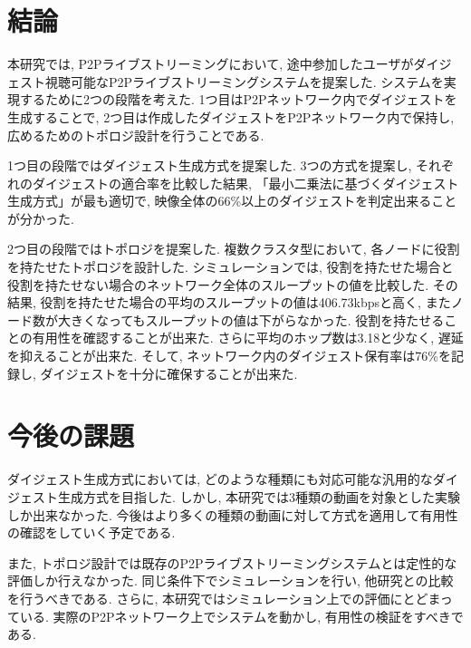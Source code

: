 \section{結論}
本研究では, P2Pライブストリーミングにおいて, 途中参加したユーザがダイジェスト視聴可能なP2Pライブストリーミングシステムを提案した. システムを実現するために2つの段階を考えた. 1つ目はP2Pネットワーク内でダイジェストを生成することで, 2つ目は作成したダイジェストをP2Pネットワーク内で保持し, 広めるためのトポロジ設計を行うことである.

1つ目の段階ではダイジェスト生成方式を提案した. 3つの方式を提案し, それぞれのダイジェストの適合率を比較した結果, 「最小二乗法に基づくダイジェスト生成方式」が最も適切で, 映像全体の66\%以上のダイジェストを判定出来ることが分かった.

2つ目の段階ではトポロジを提案した. 複数クラスタ型において, 各ノードに役割を持たせたトポロジを設計した. シミュレーションでは, 役割を持たせた場合と役割を持たせない場合のネットワーク全体のスループットの値を比較した. その結果, 役割を持たせた場合の平均のスループットの値は406.73kbpsと高く, またノード数が大きくなってもスループットの値は下がらなかった. 役割を持たせることの有用性を確認することが出来た. さらに平均のホップ数は3.18と少なく, 遅延を抑えることが出来た. そして, ネットワーク内のダイジェスト保有率は76\%を記録し, ダイジェストを十分に確保することが出来た.

\section{今後の課題}
ダイジェスト生成方式においては, どのような種類にも対応可能な汎用的なダイジェスト生成方式を目指した. しかし, 本研究では3種類の動画を対象とした実験しか出来なかった. 今後はより多くの種類の動画に対して方式を適用して有用性の確認をしていく予定である.

また, トポロジ設計では既存のP2Pライブストリーミングシステムとは定性的な評価しか行えなかった. 同じ条件下でシミュレーションを行い, 他研究との比較を行うべきである. さらに, 本研究ではシミュレーション上での評価にとどまっている. 実際のP2Pネットワーク上でシステムを動かし, 有用性の検証をすべきである.

